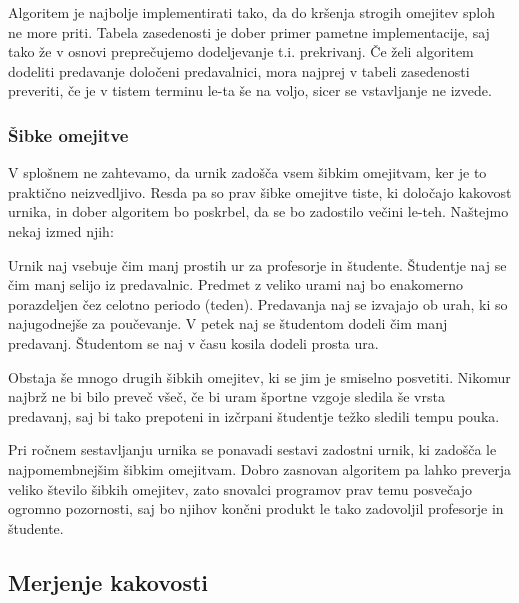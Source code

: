 \documentclass[a4paper,10pt]{article}
\begin{document}
Algoritem je najbolje implementirati tako, da do kršenja strogih omejitev sploh ne more priti.
Tabela zasedenosti je dober primer pametne implementacije, saj tako že v osnovi  preprečujemo
dodeljevanje t.i. prekrivanj. Če želi algoritem dodeliti predavanje določeni predavalnici,
mora najprej v tabeli zasedenosti preveriti, če je v tistem terminu le-ta še na voljo,
sicer se vstavljanje ne izvede.

\subsubsection{Šibke omejitve}

V splošnem ne zahtevamo, da urnik zadošča vsem šibkim omejitvam, ker je to praktično neizvedljivo.
Resda pa so prav šibke omejitve tiste, ki določajo kakovost urnika, in dober algoritem bo
poskrbel, da se bo zadostilo večini le-teh. Naštejmo nekaj izmed njih:

   Urnik naj vsebuje čim manj prostih ur za profesorje in študente.
   Študentje naj se čim manj selijo iz predavalnic.
   Predmet z veliko urami naj bo enakomerno porazdeljen čez celotno periodo (teden).
   Predavanja naj se izvajajo ob urah, ki so najugodnejše za poučevanje.
   V petek naj se študentom dodeli čim manj predavanj.
   Študentom se naj v času kosila dodeli prosta ura.

Obstaja še mnogo drugih šibkih omejitev, ki se jim je smiselno posvetiti. Nikomur najbrž ne
bi bilo preveč všeč, če bi uram športne vzgoje sledila še vrsta predavanj, saj bi tako
prepoteni in izčrpani študentje težko sledili tempu pouka.

Pri ročnem sestavljanju urnika se ponavadi sestavi zadostni urnik, ki zadošča le
najpomembnejšim šibkim omejitvam. Dobro zasnovan algoritem pa lahko preverja veliko
število šibkih omejitev, zato snovalci programov prav temu posvečajo ogromno pozornosti,
saj bo njihov končni produkt le tako zadovoljil profesorje in študente.

\subsection{Merjenje kakovosti}
\end{document}
